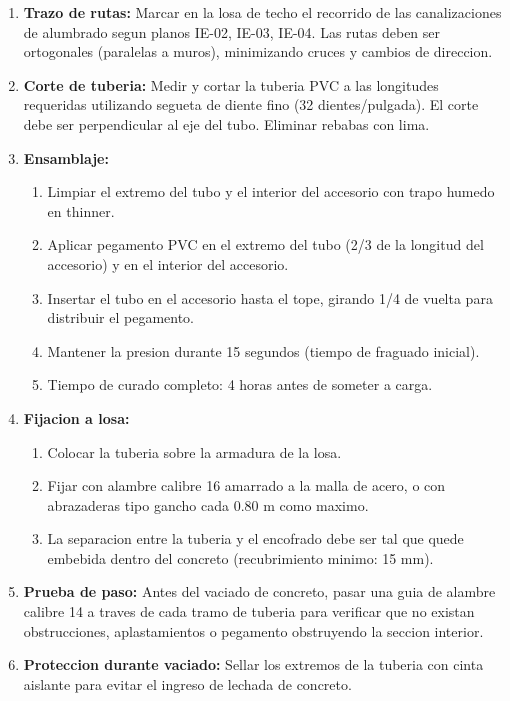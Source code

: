 \begin{enumerate}
  \item \textbf{Trazo de rutas:} Marcar en la losa de techo el recorrido de las canalizaciones de alumbrado segun planos IE-02, IE-03, IE-04. Las rutas deben ser ortogonales (paralelas a muros), minimizando cruces y cambios de direccion.
  \item \textbf{Corte de tuberia:} Medir y cortar la tuberia PVC a las longitudes requeridas utilizando segueta de diente fino (32 dientes/pulgada). El corte debe ser perpendicular al eje del tubo. Eliminar rebabas con lima.
  \item \textbf{Ensamblaje:}
  \begin{enumerate}
    \item Limpiar el extremo del tubo y el interior del accesorio con trapo humedo en thinner.
    \item Aplicar pegamento PVC en el extremo del tubo (2/3 de la longitud del accesorio) y en el interior del accesorio.
    \item Insertar el tubo en el accesorio hasta el tope, girando 1/4 de vuelta para distribuir el pegamento.
    \item Mantener la presion durante 15 segundos (tiempo de fraguado inicial).
    \item Tiempo de curado completo: 4 horas antes de someter a carga.
  \end{enumerate}
  \item \textbf{Fijacion a losa:}
  \begin{enumerate}
    \item Colocar la tuberia sobre la armadura de la losa.
    \item Fijar con alambre calibre 16 amarrado a la malla de acero, o con abrazaderas tipo gancho cada 0.80 m como maximo.
    \item La separacion entre la tuberia y el encofrado debe ser tal que quede embebida dentro del concreto (recubrimiento minimo: 15 mm).
  \end{enumerate}
  \item \textbf{Prueba de paso:} Antes del vaciado de concreto, pasar una guia de alambre calibre 14 a traves de cada tramo de tuberia para verificar que no existan obstrucciones, aplastamientos o pegamento obstruyendo la seccion interior.
  \item \textbf{Proteccion durante vaciado:} Sellar los extremos de la tuberia con cinta aislante para evitar el ingreso de lechada de concreto.
\end{enumerate}

